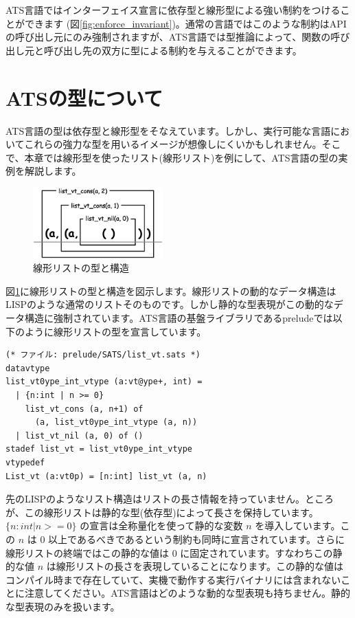 \documentclass{ipsjprosym}
\begin{document}
ATS言語ではインターフェイス宣言に依存型と線形型による強い制約をつけることができます (図\ref{fig:enforce_invariant})。通常の言語ではこのような制約はAPIの呼び出し元にのみ強制されますが、ATS言語では型推論によって、関数の呼び出し元と呼び出し先の双方に型による制約を与えることができます。

\section{ATSの型について}

ATS言語の型は依存型と線形型をそなえています。しかし、実行可能な言語においてこれらの強力な型を用いるイメージが想像しにくいかもしれません。そこで、本章では線形型を使ったリスト(線形リスト)を例にして、ATS言語の型の実例を解説します。

\begin{figure}[h]
\centering
\includegraphics[width=50mm]{draw/list_vt_type.eps}
\caption{線形リストの型と構造}
\label{fig:list_vt_type}
\end{figure}

図\ref{fig:list_vt_type}に線形リストの型と構造を図示します。線形リストの動的なデータ構造はLISPのような通常のリストそのものです。しかし静的な型表現がこの動的なデータ構造に強制されています。ATS言語の基盤ライブラリであるpreludeでは以下のように線形リストの型を宣言しています。

\vspace{3mm}
\begin{verbatim}
(* ファイル: prelude/SATS/list_vt.sats *)
datavtype
list_vt0ype_int_vtype (a:vt@ype+, int) =
  | {n:int | n >= 0}
    list_vt_cons (a, n+1) of
      (a, list_vt0ype_int_vtype (a, n))
  | list_vt_nil (a, 0) of ()
stadef list_vt = list_vt0ype_int_vtype
vtypedef
List_vt (a:vt0p) = [n:int] list_vt (a, n)
\end{verbatim}
\vspace{3mm}

先のLISPのようなリスト構造はリストの長さ情報を持っていません。ところが、この線形リストは静的な型(依存型)によって長さを保持しています。$\{n:int | n >= 0\}$ の宣言は全称量化を使って静的な変数 $n$ を導入しています。この $n$ は $0$ 以上であるべきであるという制約も同時に宣言されています。さらに線形リストの終端ではこの静的な値は $0$ に固定されています。すなわちこの静的な値 $n$ は線形リストの長さを表現していることになります。この静的な値はコンパイル時まで存在していて、実機で動作する実行バイナリには含まれないことに注意してください。ATS言語はどのような動的な型表現も持ちません。静的な型表現のみを扱います。
\end{document}
